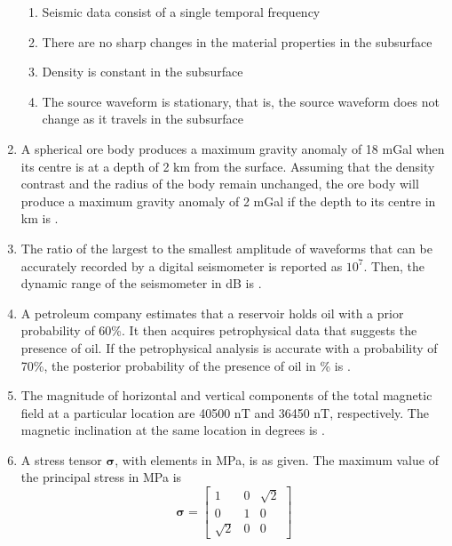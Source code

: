 \documentclass[journal,12pt,onecolumn]{IEEEtran}
\begin{document}
\begin{enumerate}
\hfill{}


\begin{enumerate}
\item Seismic data consist of a single temporal frequency
\item There are no sharp changes in the material properties in the subsurface
\item Density is constant in the subsurface
\item The source waveform is stationary, that is, the source waveform does not change as it travels in the subsurface
\end{enumerate}



\item A spherical ore body produces a maximum gravity anomaly of 18 mGal when its centre is at a depth of 2 km from the surface. Assuming that the density contrast and the radius of the body remain unchanged, the ore body will produce a maximum gravity anomaly of 2 mGal if the depth to its centre in km is  .  

\hfill{}

\item The ratio of the largest to the smallest amplitude of waveforms that can be accurately recorded by a digital seismometer is reported as $10^7$. Then, the dynamic range of the seismometer in dB is .  

\hfill{}

\item A petroleum company estimates that a reservoir holds oil with a prior probability of 60\%. It then acquires petrophysical data that suggests the presence of oil. If the petrophysical analysis is accurate with a probability of 70\%, the posterior probability of the presence of oil in \% is  .  

\hfill{}

\item The magnitude of horizontal and vertical components of the total magnetic field at a particular location are 40500 nT and 36450 nT, respectively. The magnetic inclination at the same location in degrees is  .  

\hfill{}

\item A stress tensor $\boldsymbol{\sigma}$, with elements in MPa, is as given. The maximum value of the principal stress in MPa is
\[
\boldsymbol{\sigma}=\begin{bmatrix}
1 & 0 & \sqrt{2}\\
0 & 1 & 0\\
\sqrt{2} & 0 & 0
\end{bmatrix}
\]


\end{enumerate}
\end{document}

